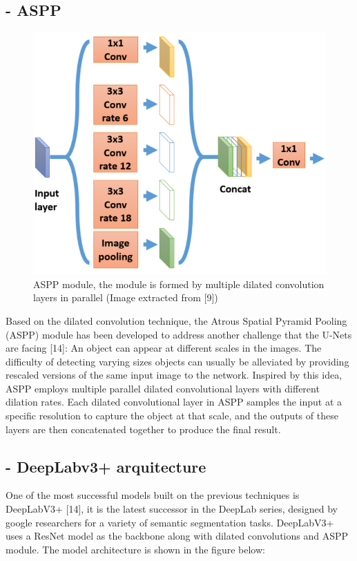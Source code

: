 \subsection{- ASPP }
\begin{figure}[H]
 \centering
 \includegraphics[scale=0.6]{IMAGENES/IMG9-ASPP.PNG}
 \captionsetup{font=large}
 \caption {ASPP module, the module is formed by multiple dilated convolution layers in parallel (Image extracted from [9]) }
\end{figure}
Based on the dilated convolution technique, the Atrous Spatial Pyramid Pooling (ASPP) module has been developed to address another challenge that the U-Nets are facing [14]: An object can appear at different scales in the images. The difficulty of detecting varying sizes objects can usually be alleviated by providing rescaled versions of the same input image to the network. Inspired by this idea, ASPP employs multiple parallel dilated convolutional layers with different dilation rates. Each dilated convolutional layer in ASPP samples the input at a specific resolution to capture the object at that scale, and the outputs of these layers are then concatenated together to produce the final result. 

\subsection{- DeepLabv3+ arquitecture}

One of the most successful models built on the previous techniques is DeepLabV3+ [14], it is the latest successor in the DeepLab series, designed by google researchers for a variety of semantic segmentation tasks. DeepLabV3+ uses a ResNet model as the backbone along with dilated convolutions and ASPP module. The model architecture is shown in the figure below: 

